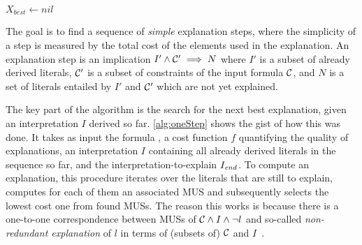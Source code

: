 \newcommand\onestep{\ensuremath{\call{explain-One-Step}}\xspace}

\begin{algorithm}[t]
  \DontPrintSemicolon
  
  \caption{$\onestep(\formulac,f,I,\Iend)$}
  \label{alg:oneStep}
$X_{best} \gets \mathit{nil}$\;
\end{algorithm}


The goal is to find a sequence of \textit{simple} explanation steps, where the simplicity of a step is measured by the total cost of the elements used in the explanation.
An explanation step is an implication $I' \wedge \mathcal{C} ' \implies N$ where $I'$ is a subset of already derived literals, $\mathcal{C} '$ is a subset of constraints of the input formula $\mathcal{C} $, and $N$ is a set of literals entailed by $I'$ and $\mathcal{C} '$ which are not yet explained.

%
The key part of the algorithm is the search for the next best explanation, given an interpretation $I$ derived so far. 
\cref{alg:oneStep} shows the gist of how this was done.
It takes as input the formula \formulac, a cost function $f$ quantifying the quality of explanations, an interpretation $I$ containing all already derived literals in the sequence so far, and the interpretation-to-explain $I_\mathit{end} $. 
To compute an explanation, this procedure iterates over the literals that are still to explain, computes for each of them an associated MUS and subsequently selects the lowest cost one from found MUSs.
The reason this works is because there is a one-to-one correspondence between MUSs of $\mathcal{C}  \land I \land \neg l$ and so-called \emph{non-redundant explanation} of $l$ in terms of (subsets of) $\mathcal{C} $ and $I$~\cite{ecai/BogaertsGCG20}. 

